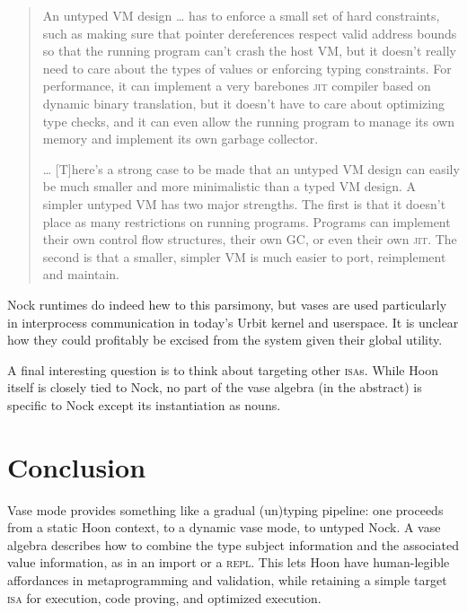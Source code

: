 \documentclass[twoside]{article}
\begin{document}
\begin{quote}
An untyped VM design \ldots{} has to enforce a small set of hard constraints, such as making sure that pointer dereferences respect valid address bounds so that the running program can't crash the host VM, but it doesn't really need to care about the types of values or enforcing typing constraints. For performance, it can implement a very barebones \textsc{jit} compiler based on dynamic binary translation, but it doesn't have to care about optimizing type checks, and it can even allow the running program to manage its own memory and implement its own garbage collector.

\ldots{} [T]here's a strong case to be made that an untyped VM design can easily be much smaller and more minimalistic than a typed VM design. A simpler untyped VM has two major strengths. The first is that it doesn't place as many restrictions on running programs. Programs can implement their own control flow structures, their own GC, or even their own \textsc{jit}. The second is that a smaller, simpler VM is much easier to port, reimplement and maintain.  \citep{Chevalier2022}
\end{quote}

\noindent
Nock runtimes do indeed hew to this parsimony, but vases are used particularly in interprocess communication in today's Urbit kernel and userspace.  It is unclear how they could profitably be excised from the system given their global utility.

A final interesting question is to think about targeting other \textsc{isa}s.  While Hoon itself is closely tied to Nock, no part of the vase algebra (in the abstract) is specific to Nock except its instantiation as nouns.

\section{Conclusion}

Vase mode provides something like a gradual (un)typing pipe\-line:  one proceeds from a static Hoon context, to a dynamic vase mode, to untyped Nock.  A vase algebra describes how to combine the type subject information and the associated value information, as in an import or a \textsc{repl}.  This lets Hoon have human-legible affordances in metaprogramming and validation, while retaining a simple target \textsc{isa} for execution, code proving, and optimized execution.

\printbibliography
\end{document}
